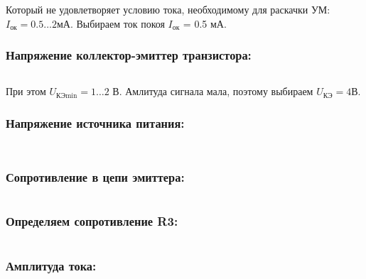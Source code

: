   Который не удовлетворяет условию тока, необходимому для раскачки УМ: $I_{\text{ок}} = 0.5 \ldots 2$мА. 
  Выбираем ток покоя $I_{\text{ок}}$ = 0.5 мА.


  \subsubsection{Напряжение коллектор-эмиттер транзистора:}  

  \begin{equation}
  \label{eq:equation6_4}
   
  \end{equation}   

  При этом $U_{\text{КЭmin}} = 1 \ldots 2$ В.
  Амлитуда сигнала мала, поэтому выбираем $U_{\text{КЭ}} = 4 $В.

  \subsubsection{Напряжение источника питания:}  

  \begin{equation}
  \label{eq:equation6_5}
    
  \end{equation} 

  \begin{equation}
  \label{eq:equation6_6}
    
  \end{equation} 

  \subsubsection{Сопротивление в цепи эмиттера:}  
  
  \begin{equation}
  \label{eq:equation6_7}
    
  \end{equation}

  \subsubsection{Определяем сопротивление R3:} %

  \begin{equation}
  \label{eq:equation6_8}
    
  \end{equation}

  \subsubsection{Амплитуда тока:} %
  
